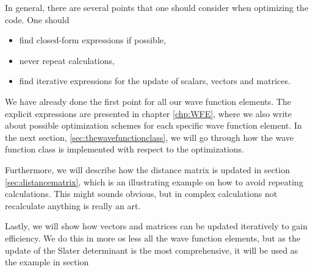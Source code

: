 In general, there are several points that one should consider when optimizing the code. One should
\begin{itemize}
	\item find closed-form expressions if possible,
	\item never repeat calculations,
	\item find iterative expressions for the update of scalars, vectors and matrices.
\end{itemize}
We have already done the first point for all our wave function elements. The explicit expressions are presented in chapter \ref{chp:WFE}, where we also write about possible optimization schemes for each specific wave function element. In the next section, \ref{sec:thewavefunctionclass}, we will go through how the wave function class is implemented with respect to the optimizations.

Furthermore, we will describe how the distance matrix is updated in section \ref{sec:distancematrix}, which is an illustrating example on how to avoid repeating calculations. This might sounds obvious, but in complex calculations not recalculate anything is really an art. 

Lastly, we will show how vectors and matrices can be updated iteratively to gain efficiency. We do this in more os less all the wave function elements, but as the update of the Slater determinant is the most comprehensive, it will be used as the example in section 

